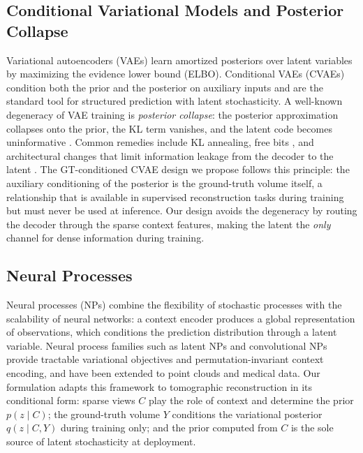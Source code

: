\subsection{Conditional Variational Models and Posterior Collapse}
\label{sec:rel:vae}

Variational autoencoders (VAEs) \cite{kingma2014vae} learn amortized
posteriors over latent variables by maximizing the evidence lower bound
(ELBO). Conditional VAEs (CVAEs) \cite{sohn2015cvae} condition both the
prior and the posterior on auxiliary inputs and are the standard tool
for structured prediction with latent stochasticity. A well-known
degeneracy of VAE training is \emph{posterior collapse}: the posterior
approximation collapses onto the prior, the KL term vanishes, and the
latent code becomes uninformative \cite{bowman2016generating,
lucas2019donot}. Common remedies include KL
annealing, free bits \cite{kingma2016freebits}, and architectural
changes that limit information leakage from the decoder to the latent
\cite{zhao2019infovae, dieng2019avoiding}. The GT-conditioned CVAE
design we propose follows this principle: the auxiliary conditioning of
the posterior is the ground-truth volume itself, a relationship that is
available in supervised reconstruction tasks during training but must
never be used at inference. Our design avoids the degeneracy by routing
the decoder through the sparse context features, making the latent the
\emph{only} channel for dense information during training.

\subsection{Neural Processes}
\label{sec:rel:np}

Neural processes (NPs) \cite{garnelo2018neural} combine the flexibility
of stochastic processes with the scalability of neural networks: a
context encoder produces a global representation of observations, which
conditions the prediction distribution through a latent variable. Neural
process families such as latent NPs \cite{garnelo2018latent} and
convolutional NPs \cite{gordon2019convolutional} provide tractable
variational objectives and permutation-invariant context encoding, and
have been extended to point clouds and medical data. Our formulation
adapts this framework to tomographic reconstruction in its conditional
form: sparse views $C$ play the role of context and determine the prior
$p(z\mid C)$; the ground-truth volume $Y$ conditions the variational
posterior $q(z\mid C,Y)$ during training only; and the prior computed
from $C$ is the sole source of latent stochasticity at deployment.

